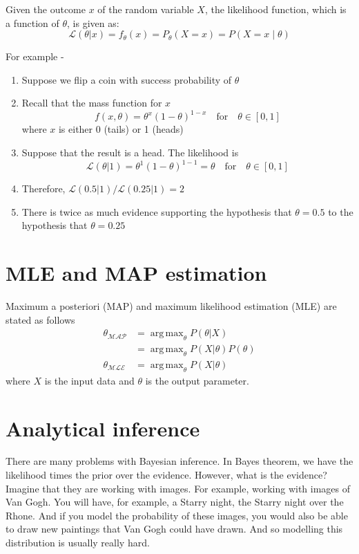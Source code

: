 \documentclass{book}
\DeclareMathOperator*{\argmax}{arg\,max}
\begin{document}
Given the outcome $x$ of the random variable $X$, the likelihood function, which is a function of $\theta$, is given as:
\begin{equation*}
\mathcal{L}(\theta|x) = f_{\theta}(x) = P_{\theta}(X = x) = P(X = x \mid \theta) 
\end{equation*} 

For example -
\begin{enumerate} \addtolength{\itemsep}{-0.5\baselineskip}
\item Suppose we flip a coin with success probability of $\theta$
\item Recall that the mass function for $x$
\[ f(x, \theta) = {\theta}^x{(1-\theta)^{1-x}} \quad \mbox{for} \quad \theta \in [0, 1]\] 
where $x$ is either 0 (tails) or 1 (heads)
\item Suppose that the result is a head. The likelihood is 
\[ \mathcal{L}(\theta|1) = {\theta}^1{(1-\theta)^{1-1}} = \theta \quad \mbox{for} \quad \theta \in [0, 1]\]
\item Therefore, $\mathcal{L}(0.5|1)/\mathcal{L}(0.25|1) = 2$
\item There is twice as much evidence supporting the hypothesis that $\theta = 0.5$ to the hypothesis that $\theta = 0.25$
\end{enumerate}

\section{MLE and MAP estimation}
Maximum a posteriori (MAP) and maximum likelihood estimation (MLE) are stated as follows
\begin{align*}
\theta_{\mathcal{MAP}} &= \argmax_{\theta} P(\theta|X) \nonumber \\
									&= \argmax_{\theta} P(X|\theta) P(\theta)  \nonumber \\
\theta_{\mathcal{MLE}} &= \argmax_{\theta} P(X|\theta) \nonumber
\end{align*}
where $X$ is the input data and $\theta$ is the output parameter.

\section{Analytical inference}
There are many problems with Bayesian inference. In Bayes theorem, we have the likelihood times the prior over the evidence. However, what is the evidence? Imagine that they are working with images. For example, working with images of Van Gogh. You will have, for example, a Starry night, the Starry night over the Rhone. And if you model the probability of these images, you would also be able to draw new paintings that Van Gogh could have drawn. And so modelling this distribution is usually really hard. 
\end{document}
